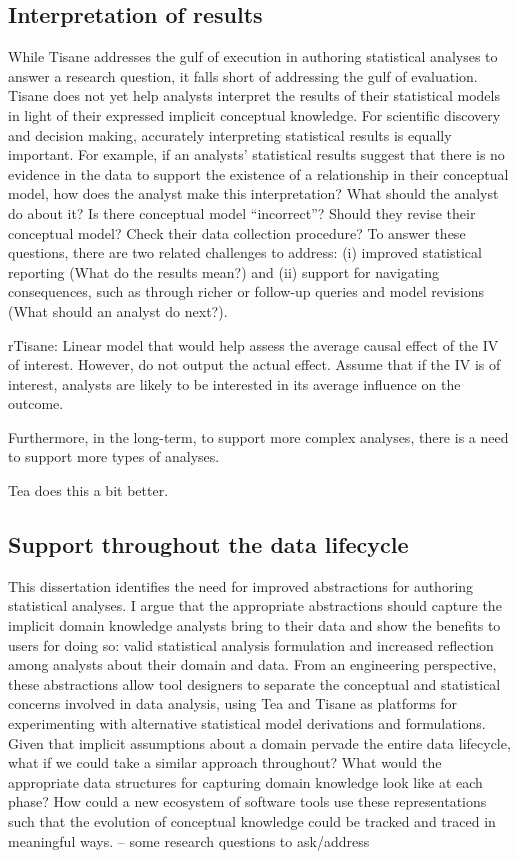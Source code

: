 \subsection{Interpretation of results}
While Tisane addresses the gulf of execution in authoring statistical analyses
to answer a research question, it falls short of addressing the gulf of
evaluation. Tisane does not yet help analysts interpret the results of their
statistical models in light of their expressed implicit conceptual knowledge.
For scientific discovery and decision making, accurately interpreting
statistical results is equally important. For example, if an analysts'
statistical results suggest that there is no evidence in the data to support the
existence of a relationship in their conceptual model, how does the analyst make
this interpretation? What should the analyst do about it? Is there conceptual
model ``incorrect''? Should they revise their conceptual model? Check their data
collection procedure? To answer these questions, there are two related
challenges to address: (i) improved statistical reporting (What do the results
mean?) and (ii) support for navigating consequences, such as through richer or
follow-up queries and model revisions (What should an analyst do next?). 


rTisane: Linear model that would help assess the average causal effect of the IV of
interest. However, do not output the actual effect. Assume that if the IV is  of
interest, analysts are likely to be interested in its average influence on the
outcome.

Furthermore, in the long-term, to support more complex analyses, there is a need
to support more types of analyses. 

Tea does this a bit better. 

\subsection{Support throughout the data lifecycle}

This dissertation identifies the need for improved abstractions for authoring
statistical analyses. I argue that the appropriate abstractions should capture
the implicit domain knowledge analysts bring to their data and show the benefits
to users for doing so: valid statistical analysis formulation and increased
reflection among analysts about their domain and data. From an engineering
perspective, these abstractions allow tool designers to separate the conceptual
and statistical concerns involved in data analysis, using Tea and Tisane as
platforms for experimenting with alternative statistical model derivations and
formulations. Given that implicit assumptions about a domain pervade the entire
data lifecycle, what if we could take a similar approach throughout? What would
the appropriate data structures for capturing domain knowledge look like at each
phase? How could a new ecosystem of software tools use these representations
such that the evolution of conceptual knowledge could be tracked and traced in
meaningful ways.  -- some research questions to ask/address

